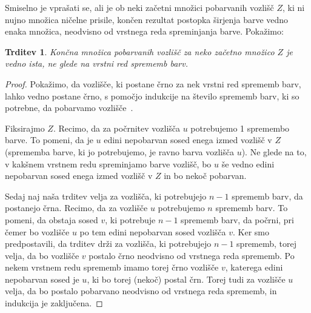 \documentclass[12pt,a4paper,twoside]{article}
\theoremstyle{definition} %
\theoremstyle{plain} %
\newtheorem{trditev}[definicija]{Trditev}
\numberwithin{equation}{section}  %
\begin{document}
Smiselno je vprašati se, ali je ob neki začetni množici pobarvanih vozlišč $Z$, ki ni nujno množica ničelne prisile, končen rezultat postopka širjenja barve vedno enaka množica, neodvisno od vrstnega reda spreminjanja barve. Pokažimo:
\begin{trditev}
    Končna množica pobarvanih vozlišč za neko začetno množico $Z$ je vedno ista, ne glede na vrstni red sprememb barv. 
\end{trditev}
\begin{proof}
    Pokažimo, da vozlišče, ki postane črno za nek vrstni red sprememb barv, lahko vedno postane črno, s pomočjo indukcije na število sprememb barv, ki so potrebne, da pobarvamo vozlišče~\cite[str.~1633]{aim2008minimumrank}. 
    
    Fiksirajmo $Z$. Recimo, da za počrnitev vozlišča $u$ potrebujemo 1 spremembo barve. To pomeni, da je $u$ edini nepobarvan sosed enega izmed vozlišč v $Z$ (sprememba barve, ki jo potrebujemo, je ravno barva vozlišča $u$). Ne glede na to, v kakšnem vrstnem redu spreminjamo barve vozlišč, bo $u$ še vedno edini nepobarvan sosed enega izmed vozlišč v $Z$ in bo nekoč pobarvan.
    
    Sedaj naj naša trditev velja za vozlišča, ki potrebujejo $n-1$ sprememb barv, da postanejo črna. Recimo, da za vozlišče $u$ potrebujemo $n$ sprememb barv. To pomeni, da obstaja sosed $v$, ki potrebuje $n-1$ sprememb barv, da počrni, pri čemer bo vozlišče $u$ po tem edini nepobarvan sosed vozlišča $v$. Ker smo predpostavili, da trditev drži za vozlišča, ki potrebujejo $n-1$ sprememb, torej velja, da bo vozlišče $v$ postalo črno neodvisno od vrstnega reda sprememb. Po nekem vrstnem redu sprememb imamo torej črno vozlišče $v$, katerega edini nepobarvan sosed je $u$, ki bo torej (nekoč) postal črn. Torej tudi za vozlišče $u$ velja, da bo postalo pobarvano neodvisno od vrstnega reda sprememb, in indukcija je zaključena.
\end{proof}
\end{document}
